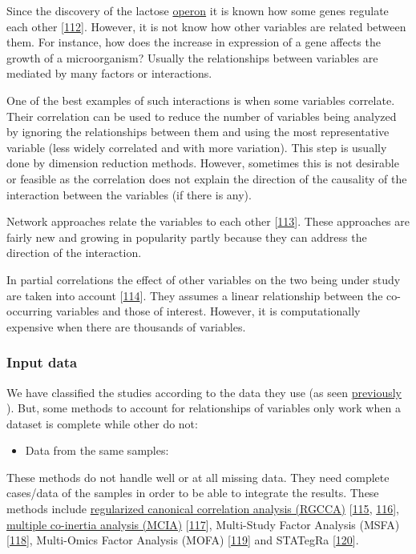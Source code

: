 \documentclass[
  12pt,
  a4paper,
  twoside,
  openright]{book}
\providecommand{\tightlist}{%
  \setlength{\itemsep}{0pt}\setlength{\parskip}{0pt}}
\begin{document}
Since the discovery of the lactose \href{https://en.wikipedia.org/wiki/Operon}{operon} it is known how some genes regulate each other {[}\protect\hyperlink{ref-jacob1961}{112}{]}.
However, it is not know how other variables are related between them.
For instance, how does the increase in expression of a gene affects the growth of a microorganism?
Usually the relationships between variables are mediated by many factors or interactions.

One of the best examples of such interactions is when some variables correlate.
Their correlation can be used to reduce the number of variables being analyzed by ignoring the relationships between them and using the most representative variable (less widely correlated and with more variation).
This step is usually done by dimension reduction methods.
However, sometimes this is not desirable or feasible as the correlation does not explain the direction of the causality of the interaction between the variables (if there is any).

Network approaches relate the variables to each other {[}\protect\hyperlink{ref-koh_iomicspass_2019}{113}{]}.
These approaches are fairly new and growing in popularity partly because they can address the direction of the interaction.

In partial correlations the effect of other variables on the two being under study are taken into account {[}\protect\hyperlink{ref-yule1907}{114}{]}.
They assumes a linear relationship between the co-occurring variables and those of interest.
However, it is computationally expensive when there are thousands of variables.

\hypertarget{input-data}{%
\subsubsection{Input data}\label{input-data}}

We have classified the studies according to the data they use (as seen \protect\hyperlink{data-origin}{previously} ).
But, some methods to account for relationships of variables only work when a dataset is complete while other do not:

\begin{itemize}
\tightlist
\item
  Data from the same samples:
\end{itemize}

These methods do not handle well or at all missing data.
They need complete cases/data of the samples in order to be able to integrate the results.
These methods include \protect\hyperlink{acronyms_RGCCA}{regularized canonical correlation analysis (RGCCA)} {[}\protect\hyperlink{ref-tenenhaus_regularized_2011}{115}, \protect\hyperlink{ref-tenenhaus_variable_2014}{116}{]}, \protect\hyperlink{acronyms_MCIA}{multiple co-inertia analysis (MCIA)} {[}\protect\hyperlink{ref-culhane_cross-platform_2003}{117}{]}, Multi-Study Factor Analysis (MSFA) {[}\protect\hyperlink{ref-vito_multi-study_2019}{118}{]}, Multi-Omics Factor Analysis (MOFA) {[}\protect\hyperlink{ref-argelaguet_multi-omics_2018}{119}{]} and STATegRa {[}\protect\hyperlink{ref-gomez-cabrero2019}{120}{]}.
\end{document}
